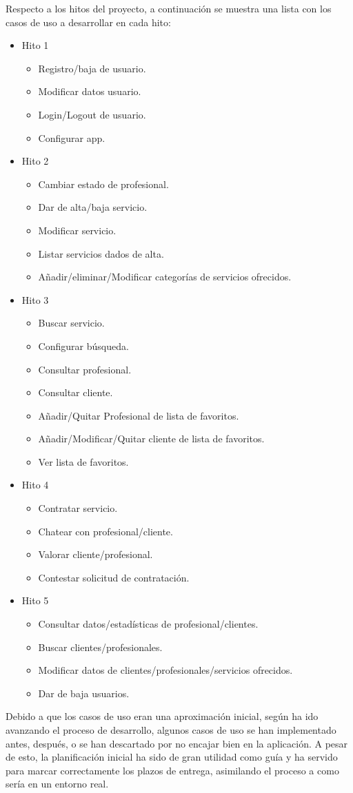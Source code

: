 Respecto a los hitos del proyecto, a continuación se muestra una lista con los casos de uso a desarrollar en cada hito:
\begin{itemize}
	\item Hito 1
	\begin{itemize}
		\item Registro/baja de usuario.
		\item Modificar datos usuario.
		\item Login/Logout de usuario.
		\item Configurar app.
	\end{itemize}
	\item Hito 2
	\begin{itemize}
		\item Cambiar estado de profesional.
		\item Dar de alta/baja servicio.
		\item Modificar servicio.
		\item Listar servicios dados de alta.
		\item Añadir/eliminar/Modificar categorías de servicios ofrecidos.
	\end{itemize}
	\item Hito 3
	\begin{itemize}
		\item Buscar servicio.
		\item Configurar búsqueda.
		\item Consultar profesional.
		\item Consultar cliente.
		\item Añadir/Quitar Profesional de lista de favoritos.
		\item Añadir/Modificar/Quitar cliente de lista de favoritos.
		\item Ver lista de favoritos.
	\end{itemize}
	\item Hito 4
	\begin{itemize}
		\item Contratar servicio.
		\item Chatear con profesional/cliente.
		\item Valorar cliente/profesional.
		\item Contestar solicitud de contratación.
	\end{itemize}
	\item Hito 5
	\begin{itemize}
		\item Consultar datos/estadísticas de profesional/clientes.
		\item Buscar clientes/profesionales.
		\item Modificar datos de clientes/profesionales/servicios ofrecidos.
		\item Dar de baja usuarios.
	\end{itemize}
\end{itemize}
Debido a que los casos de uso eran una aproximación inicial, según ha ido avanzando el proceso de desarrollo, algunos casos de uso se han implementado antes, después, o se han descartado por no encajar bien en la aplicación. A pesar de esto, la planificación inicial ha sido de gran utilidad como guía y ha servido para marcar correctamente los plazos de entrega, asimilando el proceso a como sería en un entorno real.